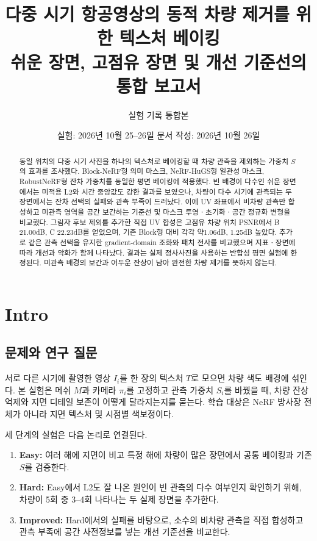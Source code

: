 \documentclass[11pt,a4paper]{article}
\title{다중 시기 항공영상의 동적 차량 제거를 위한 텍스처 베이킹\\\large 쉬운 장면, 고점유 장면 및 개선 기준선의 통합 보고서}
\author{실험 기록 통합본}
\date{실험: 2026년 10월 25--26일 \quad 문서 작성: 2026년 10월 26일}
\begin{document}
\maketitle
\begin{abstract}
동일 위치의 다중 시기 사진을 하나의 텍스처로 베이킹할 때 차량 관측을 제외하는 가중치 $S$의 효과를 조사했다. Block-NeRF형 의미 마스크, NeRF-HuGS형 일관성 마스크, RobustNeRF형 잔차 가중치를 동일한 평면 베이킹에 적용했다. 빈 배경이 다수인 쉬운 장면에서는 미적용 L2와 시간 중앙값도 강한 결과를 보였으나, 차량이 다수 시기에 관측되는 두 장면에서는 잔차 선택의 실패와 관측 부족이 드러났다. 이에 UV 좌표에서 비차량 관측만 합성하고 미관측 영역을 공간 보간하는 기준선 및 마스크 투영ㆍ초기화ㆍ공간 정규화 변형을 비교했다. 그림자 후보 제외를 추가한 직접 UV 합성은 고점유 차량 위치 PSNR에서 B 21.00dB, C 22.23dB를 얻었으며, 기존 Block형 대비 각각 약1.06dB, 1.25dB 높았다. 추가로 같은 관측 선택을 유지한 gradient-domain 조화와 패치 전사를 비교했으며 지표ㆍ장면에 따라 개선과 악화가 함께 나타났다. 결과는 실제 정사사진을 사용하는 반합성 평면 실험에 한정된다. 미관측 배경의 보간과 어두운 잔상이 남아 완전한 차량 제거를 뜻하지 않는다.
\end{abstract}
\tableofcontents
\clearpage
\section{Intro}
\subsection{문제와 연구 질문}
서로 다른 시기에 촬영한 영상 $I_i$를 한 장의 텍스처 $T$로 모으면 차량 색도 배경에 섞인다. 본 실험은 메쉬 $M$과 카메라 $\pi_i$를 고정하고 관측 가중치 $S_i$를 바꿨을 때, 차량 잔상 억제와 지면 디테일 보존이 어떻게 달라지는지를 묻는다. 학습 대상은 NeRF 방사장 전체가 아니라 지면 텍스처 및 시점별 색보정이다.

세 단계의 실험은 다음 논리로 연결된다.
\begin{enumerate}
\item \textbf{Easy:} 여러 해에 지면이 비고 특정 해에 차량이 많은 장면에서 공통 베이킹과 기존 $S$를 검증한다.
\item \textbf{Hard:} Easy에서 L2도 잘 나온 원인이 빈 관측의 다수 여부인지 확인하기 위해, 차량이 5회 중 3--4회 나타나는 두 실제 장면을 추가한다.
\item \textbf{Improved:} Hard에서의 실패를 바탕으로, 소수의 비차량 관측을 직접 합성하고 관측 부족에 공간 사전정보를 넣는 개선 기준선을 비교한다.
\end{enumerate}
\end{document}
